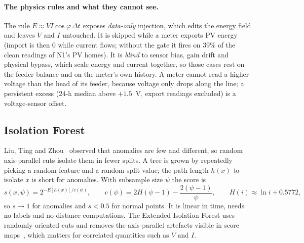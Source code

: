 \documentclass[11pt,a4paper]{article}
\begin{document}
\paragraph{The physics rules and what they cannot see.} The rule $E\approx V I\cos\varphi\,\Delta t$ exposes
\emph{data-only} injection, which edits the energy field and leaves $V$ and $I$ untouched. It is skipped while
a meter exports PV energy (import is then 0 while current flows; without the gate it fires on 39\% of the clean
readings of N1's PV homes). It is \emph{blind} to sensor bias, gain drift and physical bypass, which scale
energy and current together, so those cases rest on the feeder balance and on the meter's own history.
A meter cannot read a higher voltage than the head of its feeder, because voltage only drops along the line;
a persistent excess (24-h median above $+1.5$~V, export readings excluded) is a voltage-sensor offset.

\subsection{Isolation Forest}
Liu, Ting and Zhou~\cite{iforest} observed that anomalies are few and different, so random axis-parallel
cuts isolate them in fewer splits. A tree is grown by repeatedly picking a random feature and a random split
value; the path length $h(x)$ to isolate $x$ is short for anomalies. With subsample size $\psi$ the score is
\begin{equation}
  s(x,\psi)=2^{-E[h(x)]/c(\psi)},\qquad c(\psi)=2H(\psi-1)-\frac{2(\psi-1)}{\psi},\qquad H(i)\approx\ln i+0.5772,
\end{equation}
so $s\to1$ for anomalies and $s<0.5$ for normal points. It is linear in time, needs no labels and no distance
computations. The Extended Isolation Forest uses randomly oriented cuts and removes the axis-parallel
artefacts visible in score maps~\cite{eif}, which matters for correlated quantities such as $V$ and $I$.
\end{document}
